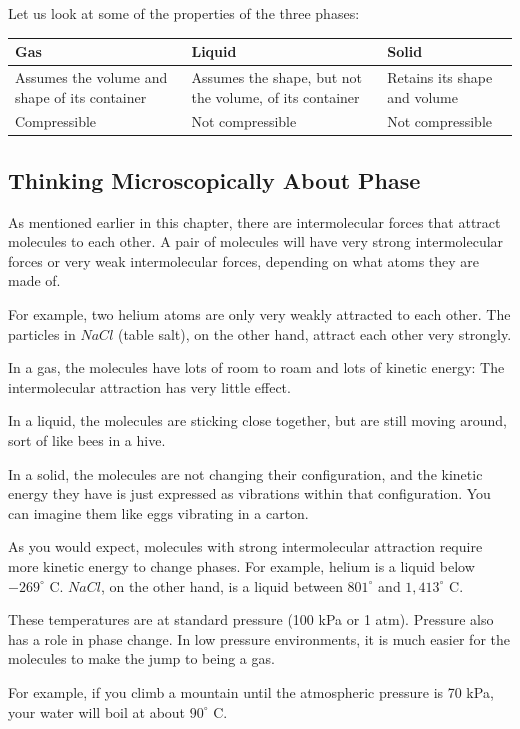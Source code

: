 Let us look at some of the properties of the three phases:

\begin{tabular}{p{5cm}|p{5cm}|p{5cm}}
Gas & Liquid & Solid \\
\hline
Assumes the volume and shape of its container & 
Assumes the shape, but not the volume, of its container &
Retains its shape and volume \\
\hline
Compressible & Not compressible & Not compressible \\
\end{tabular}

\subsection{Thinking Microscopically About Phase}

As mentioned earlier in this chapter, there are intermolecular forces that attract molecules to each
other. A pair of molecules will have very strong intermolecular forces or very weak intermolecular forces,
depending on what atoms they are made of.

For example, two helium atoms are only very weakly attracted to each other. The particles in $NaCl$ (table salt), on the other hand, attract each other very strongly.

In a gas, the molecules have lots of room to roam and lots of kinetic energy: The intermolecular attraction has very little effect.

In a liquid, the molecules are sticking close together, but are still moving around, sort of like bees in a hive.

In a solid, the molecules are not changing their configuration, and the kinetic energy they have is just expressed as vibrations within that configuration. You can imagine them like eggs vibrating in a carton.

As you would expect, molecules with strong intermolecular attraction require more kinetic energy to change phases. For example, helium is a liquid below $-269^\circ$ C. $NaCl$, on the other hand, is a liquid between $801^\circ$ and $1,413^\circ$ C. 

These temperatures are at standard pressure (100 kPa or 1 atm). Pressure also has a role in phase change. In low pressure environments, it is much easier for the molecules to make the jump to being a gas.

For example, if you climb a mountain until the atmospheric pressure is 70 kPa, your water will boil at about $90^\circ$ C. 

